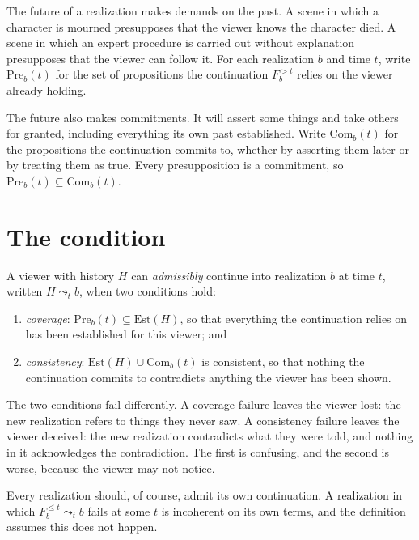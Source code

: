 The future of a realization makes demands on the past. A scene in which a character is mourned presupposes that the viewer knows the character died. A scene in which an expert procedure is carried out without explanation presupposes that the viewer can follow it. For each realization $b$ and time $t$, write $\mathrm{Pre}_b(t)$ for the set of propositions the continuation $F_b^{>t}$ relies on the viewer already holding.

The future also makes commitments. It will assert some things and take others for granted, including everything its own past established. Write $\mathrm{Com}_b(t)$ for the propositions the continuation commits to, whether by asserting them later or by treating them as true. Every presupposition is a commitment, so $\mathrm{Pre}_b(t)\subseteq\mathrm{Com}_b(t)$.

\section{The condition}

\begin{definition}
A viewer with history $H$ can \emph{admissibly} continue into realization $b$ at time $t$, written $H\leadsto_t b$, when two conditions hold:
\begin{enumerate}
\item \emph{coverage}: $\mathrm{Pre}_b(t)\subseteq\mathrm{Est}(H)$, so that everything the continuation relies on has been established for this viewer; and
\item \emph{consistency}: $\mathrm{Est}(H)\cup\mathrm{Com}_b(t)$ is consistent, so that nothing the continuation commits to contradicts anything the viewer has been shown.
\end{enumerate}
\end{definition}

The two conditions fail differently. A coverage failure leaves the viewer lost: the new realization refers to things they never saw. A consistency failure leaves the viewer deceived: the new realization contradicts what they were told, and nothing in it acknowledges the contradiction. The first is confusing, and the second is worse, because the viewer may not notice.

Every realization should, of course, admit its own continuation. A realization in which $F_b^{\le t}\leadsto_t b$ fails at some $t$ is incoherent on its own terms, and the definition assumes this does not happen.

